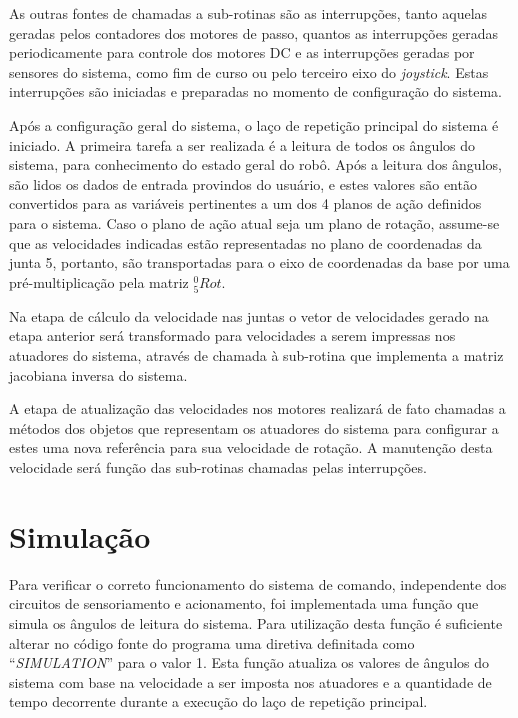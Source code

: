 As outras fontes de chamadas a sub-rotinas são as interrupções, tanto aquelas geradas pelos contadores
dos motores de passo, quantos as interrupções geradas periodicamente para controle dos motores DC e 
as interrupções geradas por sensores do sistema, como fim de curso ou pelo terceiro eixo do \textit{joystick}. 
Estas interrupções são iniciadas e preparadas no momento de configuração do sistema.

Após a configuração geral do sistema, o laço de repetição principal do sistema é iniciado. 
A primeira tarefa a ser realizada é a leitura de todos os ângulos do sistema, para conhecimento
do estado geral do robô. Após a leitura dos ângulos, são lidos os dados de entrada provindos do 
usuário, e estes valores são então convertidos para as variáveis pertinentes a um dos 4 planos de
ação definidos para o sistema.
Caso o plano de ação 
atual seja um plano de rotação, assume-se que as velocidades indicadas estão representadas no
plano de coordenadas da junta 5, portanto, são transportadas para o eixo de coordenadas da base
por uma pré-multiplicação pela matriz $^0_5Rot$.

Na etapa de cálculo da velocidade nas juntas o vetor de velocidades gerado na etapa anterior será 
transformado para velocidades a serem impressas nos atuadores do sistema, através de chamada
à sub-rotina que implementa a matriz jacobiana inversa do sistema.

A etapa de atualização das velocidades nos motores realizará de fato chamadas a métodos
dos objetos que representam os atuadores do sistema para configurar a estes uma nova referência 
para sua velocidade de rotação. A manutenção desta velocidade será função das sub-rotinas 
chamadas pelas interrupções.

\section{Simulação}

Para verificar o correto funcionamento do sistema de comando, independente dos circuitos de
sensoriamento e acionamento, foi implementada uma função que simula os ângulos de leitura do sistema. 
Para utilização desta função é suficiente alterar no código fonte do programa uma diretiva
definitada como ``\textit{SIMULATION}'' para o valor 1.
Esta função atualiza os valores de ângulos do sistema com base na velocidade a ser imposta nos atuadores
e a quantidade de tempo decorrente durante a execução do laço de repetição principal. 


